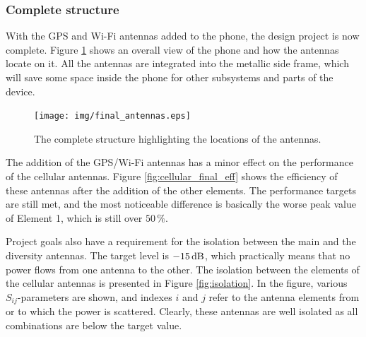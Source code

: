 \subsubsection{Complete structure}
\label{sec:complete_structure}
With the GPS and Wi-Fi antennas added to the phone, the design project is now complete. Figure \ref{fig:complete_struct} shows an overall view of the phone and how the antennas locate on it. All the antennas are integrated into the metallic side frame, which will save some space inside the phone for other subsystems and parts of the device.

\begin{figure}[H]
    \centering
    \texttt{[image: img/final\_antennas.eps]}
    \caption{The complete structure highlighting the locations of the antennas.}
    \label{fig:complete_struct}
\end{figure}

The addition of the GPS/Wi-Fi antennas has a minor effect on the performance of the cellular antennas. Figure \ref{fig:cellular_final_eff} shows the efficiency of these antennas after the addition of the other elements. The performance targets are still met, and the most noticeable difference is basically the worse peak value of Element 1, which is still over $50\,\%$.

Project goals also have a requirement for the isolation between the main and the diversity antennas. The target level is $-15\,\mathrm{dB}$, which practically means that no power flows from one antenna to the other. The isolation between the elements of the cellular antennas is presented in Figure \ref{fig:isolation}. In the figure, various $S_{ij}$-parameters are shown, and indexes $i$ and $j$ refer to the antenna elements from or to which the power is scattered. Clearly, these antennas are well isolated as all combinations are below the target value.

